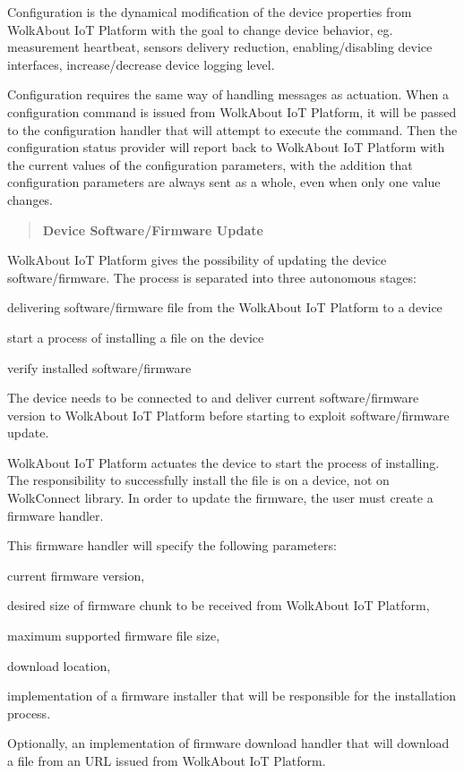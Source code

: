 Configuration is the dynamical modification of the device properties from Wolk\+About IoT Platform with the goal to change device behavior, eg. measurement heartbeat, sensors delivery reduction, enabling/disabling device interfaces, increase/decrease device logging level.

Configuration requires the same way of handling messages as actuation. When a configuration command is issued from Wolk\+About IoT Platform, it will be passed to the configuration handler that will attempt to execute the command. Then the configuration status provider will report back to Wolk\+About IoT Platform with the current values of the configuration parameters, with the addition that configuration parameters are always sent as a whole, even when only one value changes.

\label{_dfu}%
 \begin{quote}
{\bfseries Device Software/\+Firmware Update} \end{quote}


Wolk\+About IoT Platform gives the possibility of updating the device software/firmware. The process is separated into three autonomous stages\+:


\begin{DoxyItemize}
\item delivering software/firmware file from the Wolk\+About IoT Platform to a device
\item start a process of installing a file on the device
\item verify installed software/firmware
\end{DoxyItemize}

The device needs to be connected to and deliver current software/firmware version to Wolk\+About IoT Platform before starting to exploit software/firmware update.

Wolk\+About IoT Platform actuates the device to start the process of installing. The responsibility to successfully install the file is on a device, not on Wolk\+Connect library. In order to update the firmware, the user must create a firmware handler.

This firmware handler will specify the following parameters\+:


\begin{DoxyItemize}
\item current firmware version,
\item desired size of firmware chunk to be received from Wolk\+About IoT Platform,
\item maximum supported firmware file size,
\item download location,
\item implementation of a firmware installer that will be responsible for the installation process.
\item Optionally, an implementation of firmware download handler that will download a file from an U\+RL issued from Wolk\+About IoT Platform.
\end{DoxyItemize}



